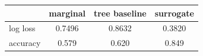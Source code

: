 \begin{tabular}{lccc}
\toprule
 & marginal & tree baseline & surrogate \\
\midrule
log loss & 0.7496 & 0.8632 & 0.3820 \\
accuracy & 0.579 & 0.620 & 0.849 \\
\bottomrule
\end{tabular}

